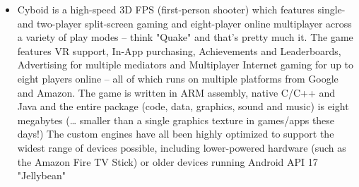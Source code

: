 {\begin{itemize}
      \item Cyboid is a high-speed 3D FPS (first-person shooter) which features single- and two-player split-screen gaming and eight-player online multiplayer across a variety of play modes -- think "Quake" and that's pretty much it. The game features VR support, In-App purchasing, Achievements and Leaderboards, Advertising for multiple mediators and Multiplayer Internet gaming for up to eight players online -- all of which runs on multiple platforms from Google and Amazon. The game is written in ARM assembly, native C/C++ and Java and the entire package (code, data, graphics, sound and music) is eight megabytes (… smaller than a single graphics texture in games/apps these days!) The custom engines have all been highly optimized to support the widest range of devices possible, including lower-powered hardware (such as the Amazon Fire TV Stick) or older devices running Android API 17 "Jellybean"
     \end{itemize}
     }
 




